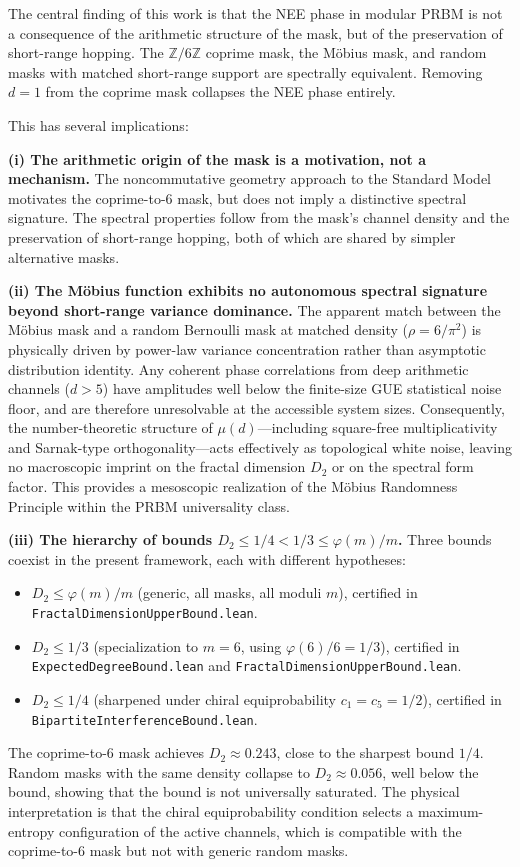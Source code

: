 \documentclass[11pt,a4paper]{article}
\newcommand{\Zmod}{\mathbb{Z}/6\mathbb{Z}}
\begin{document}
The central finding of this work is that the NEE phase in modular PRBM is not a consequence of the arithmetic structure of the mask, but of the preservation of short-range hopping. The $\Zmod$ coprime mask, the Möbius mask, and random masks with matched short-range support are spectrally equivalent. Removing $d = 1$ from the coprime mask collapses the NEE phase entirely.

This has several implications:

\textbf{(i) The arithmetic origin of the mask is a motivation, not a mechanism.} The noncommutative geometry approach to the Standard Model motivates the coprime-to-6 mask, but does not imply a distinctive spectral signature. The spectral properties follow from the mask's channel density and the preservation of short-range hopping, both of which are shared by simpler alternative masks.

\textbf{(ii) The M\"obius function exhibits no autonomous spectral signature beyond short-range variance dominance.}
The apparent match between the M\"obius mask and a random Bernoulli mask
at matched density ($\rho = 6/\pi^2$) is physically driven by power-law
variance concentration rather than asymptotic distribution identity. Any
coherent phase correlations from deep arithmetic channels ($d > 5$) have
amplitudes well below the finite-size GUE statistical noise floor, and
are therefore unresolvable at the accessible system sizes. Consequently,
the number-theoretic structure of $\mu(d)$—including square-free
multiplicativity and Sarnak-type orthogonality—acts effectively as
topological white noise, leaving no macroscopic imprint on the fractal
dimension $D_2$ or on the spectral form factor. This provides a mesoscopic
realization of the Möbius Randomness Principle within the PRBM universality
class.

\textbf{(iii) The hierarchy of bounds $D_2 \le 1/4 < 1/3 \le \varphi(m)/m$.} Three bounds coexist in the present framework, each with different hypotheses:
\begin{itemize}
    \item $D_2 \le \varphi(m)/m$ (generic, all masks, all moduli $m$), certified in \texttt{FractalDimensionUpperBound.lean}.
    \item $D_2 \le 1/3$ (specialization to $m=6$, using $\varphi(6)/6 = 1/3$), certified in \texttt{ExpectedDegreeBound.lean} and \texttt{FractalDimensionUpperBound.lean}.
    \item $D_2 \le 1/4$ (sharpened under chiral equiprobability $c_1 = c_5 = 1/2$), certified in\\ \texttt{BipartiteInterferenceBound.lean}.
\end{itemize}
The coprime-to-6 mask achieves $D_2 \approx 0.243$, close to the sharpest bound $1/4$. Random masks with the same density collapse to $D_2 \approx 0.056$, well below the bound, showing that the bound is not universally saturated. The physical interpretation is that the chiral equiprobability condition selects a maximum-entropy configuration of the active channels, which is compatible with the coprime-to-6 mask but not with generic random masks.
\end{document}
